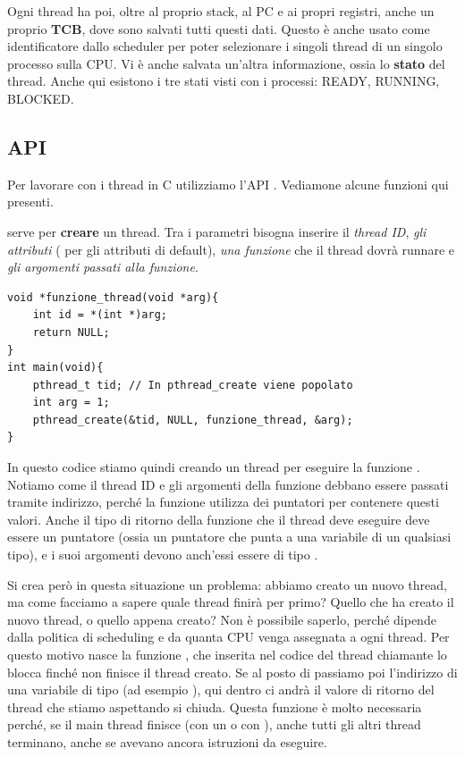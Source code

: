 \documentclass[11pt, a4paper, titlepage, oneside]{scrbook}
\begin{document}
Ogni thread ha poi, oltre al proprio stack, al PC e ai propri registri, anche un proprio \textbf{TCB}, dove sono salvati tutti questi dati. Questo è anche usato come identificatore dallo scheduler per poter selezionare i singoli thread di un singolo processo sulla CPU. Vi è anche salvata un'altra informazione, ossia lo \textbf{stato} del thread. Anche qui esistono i tre stati visti con i processi: READY, RUNNING, BLOCKED. 

\subsection{ API}

Per lavorare con i thread in C utilizziamo l'API . Vediamone alcune funzioni qui presenti.

 serve per \textbf{creare} un thread. Tra i parametri bisogna inserire il \textit{thread ID}, \textit{gli attributi} ( per gli attributi di default), \textit{una funzione} che il thread dovrà runnare e \textit{gli argomenti passati alla funzione}.

\begin{lstlisting}[style=C]
void *funzione_thread(void *arg){
    int id = *(int *)arg;
    return NULL;
}
int main(void){
    pthread_t tid; // In pthread_create viene popolato
    int arg = 1;
    pthread_create(&tid, NULL, funzione_thread, &arg);
}
\end{lstlisting}

In questo codice stiamo quindi creando un thread per eseguire la funzione . Notiamo come il thread ID e gli argomenti della funzione debbano essere passati tramite indirizzo, perché la funzione  utilizza dei puntatori per contenere questi valori. Anche il tipo di ritorno della funzione che il thread deve eseguire deve essere un puntatore  (ossia un puntatore che punta a una variabile di un qualsiasi tipo), e i suoi argomenti devono anch'essi essere di tipo .

Si crea però in questa situazione un problema: abbiamo creato un nuovo thread, ma come facciamo a sapere quale thread finirà per primo? Quello che ha creato il nuovo thread, o quello appena creato? Non è possibile saperlo, perché dipende dalla politica di scheduling e da quanta CPU venga assegnata a ogni thread. Per questo motivo nasce la funzione , che inserita nel codice del thread chiamante lo blocca finché non finisce il thread creato. Se al posto di  passiamo poi l'indirizzo di una variabile di tipo  (ad esempio ), qui dentro ci andrà il valore di ritorno del thread che stiamo aspettando si chiuda. Questa funzione è molto necessaria perché, se il main thread finisce (con un  o con ), anche tutti gli altri thread terminano, anche se avevano ancora istruzioni da eseguire. 
\end{document}
